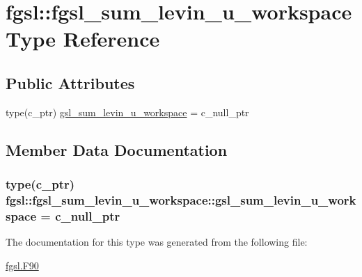 \hypertarget{structfgsl_1_1fgsl__sum__levin__u__workspace}{\section{fgsl\-:\-:fgsl\-\_\-sum\-\_\-levin\-\_\-u\-\_\-workspace Type Reference}
\label{structfgsl_1_1fgsl__sum__levin__u__workspace}
}
\subsection*{Public Attributes}
\begin{DoxyCompactItemize}
\item 
type(c\-\_\-ptr) \hyperlink{structfgsl_1_1fgsl__sum__levin__u__workspace_a316ec6b79426fa7cfd0939aa41d162ec}{gsl\-\_\-sum\-\_\-levin\-\_\-u\-\_\-workspace} = c\-\_\-null\-\_\-ptr
\end{DoxyCompactItemize}


\subsection{Member Data Documentation}
\hypertarget{structfgsl_1_1fgsl__sum__levin__u__workspace_a316ec6b79426fa7cfd0939aa41d162ec}{
\subsubsection[{gsl\-\_\-sum\-\_\-levin\-\_\-u\-\_\-workspace}]{\setlength{\rightskip}{0pt plus 5cm}type(c\-\_\-ptr) fgsl\-::fgsl\-\_\-sum\-\_\-levin\-\_\-u\-\_\-workspace\-::gsl\-\_\-sum\-\_\-levin\-\_\-u\-\_\-workspace = c\-\_\-null\-\_\-ptr}}\label{structfgsl_1_1fgsl__sum__levin__u__workspace_a316ec6b79426fa7cfd0939aa41d162ec}


The documentation for this type was generated from the following file\-:\begin{DoxyCompactItemize}
\item 
\hyperlink{fgsl_8F90}{fgsl.\-F90}\end{DoxyCompactItemize}
